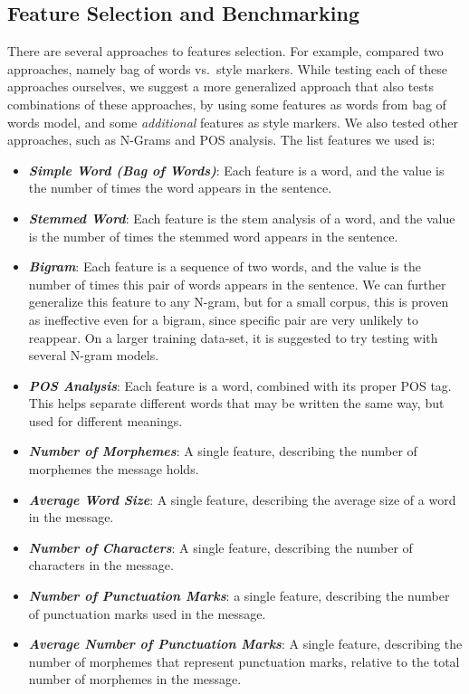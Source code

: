 \documentclass[a4paper]{article}
\begin{document}
\subsection{Feature Selection and Benchmarking}

There are several approaches to features selection. For example, \citep{green} compared two approaches, namely bag of words vs.\ style markers.
While testing each of these approaches ourselves, we suggest a more generalized approach that also tests combinations of these approaches, by using some features as words from bag of words model, and some \emph{additional} features as style markers.
We also tested other approaches, such as N-Grams and POS analysis. The list features we used is:
\begin{itemize}
\item \textbf{\emph{Simple Word (Bag of Words)}}: Each feature is a word, and the value is the number of times the word appears in the sentence.
\item \textbf{\emph{Stemmed Word}}: Each feature is the stem analysis of a word, and the value is the number of times the stemmed word appears in the sentence.
\item \textbf{\emph{Bigram}}: Each feature is a sequence of two words, and the value is the number of times this pair of words appears in the sentence. We can further generalize this feature to any N-gram, but for a small corpus, this is proven as ineffective even for a bigram, since specific pair are very unlikely to reappear. On a larger training data-set, it is suggested to try testing with several N-gram models.
\item \textbf{\emph{POS Analysis}}: Each feature is a word, combined with its proper POS tag. This helps separate different words that may be written the same way, but used for different meanings.
\item \textbf{\emph{Number of Morphemes}}: A single feature, describing the number of morphemes the message holds.
\item \textbf{\emph{Average Word Size}}: A single feature, describing the average size of a word in the message.
\item \textbf{\emph{Number of Characters}}: A single feature, describing the number of characters in the message.
\item \textbf{\emph{Number of Punctuation Marks}}: a single feature, describing the number of punctuation marks used in the message.
\item \textbf{\emph{Average Number of Punctuation Marks}}: A single feature, describing the number of morphemes that represent punctuation marks, relative to the total number of morphemes in the message.

\end{itemize}
\end{document}
